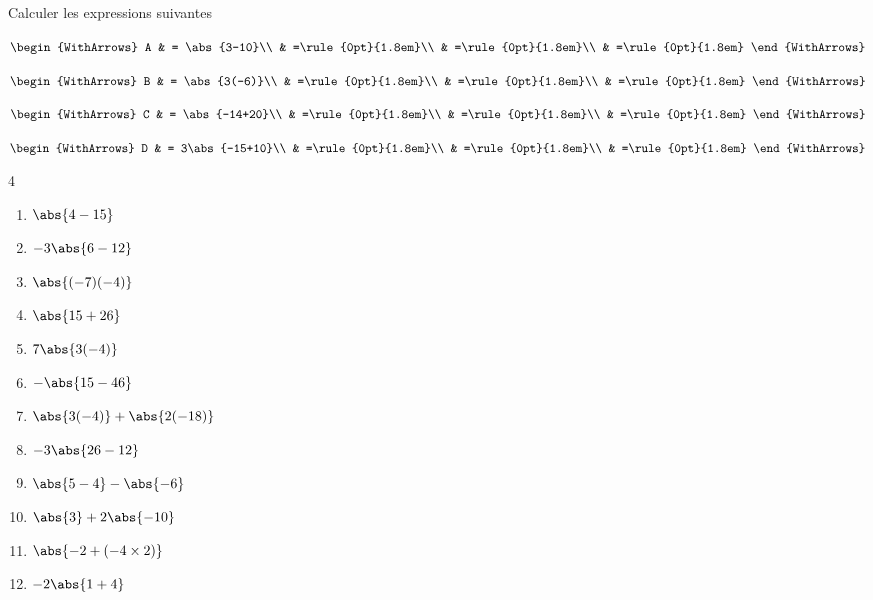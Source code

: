 \documentclass[main.tex]{subfiles}
\begin{document}
\begin{example}[Je fais]  Calculer les expressions suivantes \hfill 
	
	\noindent\parbox{0.23\linewidth}{
		$\begin{WithArrows}
			A & = \abs{3-10}\\
			& =\rule{0pt}{1.8em}\\ 
			& =\rule{0pt}{1.8em}\\ 
			& =\rule{0pt}{1.8em}
		\end{WithArrows}$
	}\hfill
	\parbox{0.23\linewidth}{
		$\begin{WithArrows}
			B & = \abs{3(-6)}\\
			& =\rule{0pt}{1.8em}\\ 
			& =\rule{0pt}{1.8em}\\ 
			& =\rule{0pt}{1.8em}
		\end{WithArrows}$
	}\hfill
	\parbox{0.23\linewidth}{
		$\begin{WithArrows}
			C & = \abs{-14+20}\\
			& =\rule{0pt}{1.8em}\\ 
			& =\rule{0pt}{1.8em}\\ 
			& =\rule{0pt}{1.8em}
		\end{WithArrows}$
	}\hfill
	\parbox{0.23\linewidth}{
		$\begin{WithArrows}
			D & = 3\abs{-15+10}\\
			& =\rule{0pt}{1.8em}\\ 
			& =\rule{0pt}{1.8em}\\ 
			& =\rule{0pt}{1.8em}
		\end{WithArrows}$
	}
\end{example} 
\begin{exercise}\hfill 
	\begin{multicols}{4}
		\begin{enumerate}[label={\Alph*=}, leftmargin=*]  
			\item $\abs{4-15}$  
			\item $-3\abs{6-12}$ 
			\item $\abs{(-7)(-4)}$ 
			\item $\abs{15+26}$  
			\item $7\abs{3(-4)}$  
			\item $-\abs{15-46}$  
			\item $\abs{3(-4)}+\abs{2(-18)}$
			\item $-3\abs{26-12}$
			\item $\abs{5-4}-\abs{-6}$
			\item $\abs{3}+2\abs{-10}$
			\item $\abs{-2+(-4\times 2)}$
			\item $-2\abs{1+4}$
		\end{enumerate}
	\end{multicols}
\end{exercise}
\end{document}
